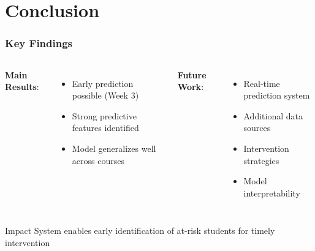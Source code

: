\documentclass{beamer}
\begin{document}
\section{Conclusion}

\begin{frame}
\frametitle{Key Findings}
    \begin{columns}
        \textbf{Main Results}:
            \begin{itemize}
            \item Early prediction possible (Week 3)
            \item Strong predictive features identified
            \item Model generalizes well across courses
            \end{itemize}
            
        \textbf{Future Work}:
            \begin{itemize}
            \item Real-time prediction system
            \item Additional data sources
            \item Intervention strategies
            \item Model interpretability
            \end{itemize}
                
    \end{columns}

    \begin{alertblock}{Impact}
        System enables early identification of at-risk students for timely intervention
    \end{alertblock}
\end{frame}
\end{document}
